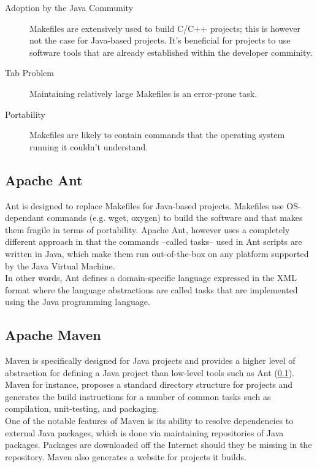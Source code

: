 \begin{description}
\item[Adoption by the Java Community] 
Makefiles are extensively used to build C/C++ projects; this is however
not the case for Java-based projects. It's beneficial for projects
to use software tools that are already established within the
developer comminity.
\item[Tab Problem]
Maintaining relatively large Makefiles is an error-prone task.
\item[Portability]
Makefiles are likely to contain commands that the operating system
running it couldn't understand.
\end{description}

\subsection{Apache Ant}\label{BuildSystemToolsAnt}
Ant is designed to replace Makefiles for Java-based projects. Makefiles use
OS-dependant commands (e.g. wget, oxygen) to build the software and that
makes them fragile in terms of portability. Apache Ant, however uses
a completely different approach in that the commands --called tasks--
used in Ant scripts are written in Java, which make them run out-of-the-box
on any platform supported by the Java Virtual Machine.\\

In other words, Ant defines a domain-specific language expressed in the
XML format where the language abstractions are called tasks that are 
implemented using the Java programming language.

\subsection{Apache Maven}\label{BuildSystemToolsMaven}
Maven is specifically designed for Java projects and provides a higher
level of abstraction for defining a Java project than low-level tools
such as Ant (\ref{BuildSystemToolsAnt}). 
Maven for instance, proposes a standard directory structure
for projects and generates the build instructions for a number of 
common tasks such as compilation, unit-testing, and packaging.\\

One of the notable features of Maven is its ability to resolve
dependencies to external Java packages, which is done via
maintaining repositories of Java packages. Packages are downloaded
off the Internet should they be missing in the repository. Maven 
also generates a website for projects it builds.

